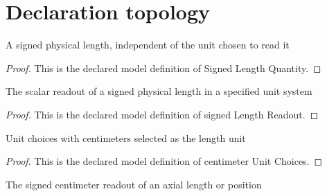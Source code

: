 \section{Declaration topology}
\begin{definition}
  \label{def:physics:phyx-mini-0076:phyxminiproblems-problemphyxmini0076-signedlengthquantity}
  A signed physical length, independent of the unit chosen to read it
\end{definition}
\begin{proof}
  This is the declared model definition of Signed Length Quantity.
\end{proof}
\begin{definition}
  \label{def:physics:phyx-mini-0076:phyxminiproblems-problemphyxmini0076-signedlengthreadout}
  The scalar readout of a signed physical length in a specified unit system
\end{definition}
\begin{proof}
  This is the declared model definition of signed Length Readout.
\end{proof}
\begin{definition}
  \label{def:physics:phyx-mini-0076:phyxminiproblems-problemphyxmini0076-centimeterunitchoices}
  Unit choices with centimeters selected as the length unit
\end{definition}
\begin{proof}
  This is the declared model definition of centimeter Unit Choices.
\end{proof}
\begin{definition}
  \label{def:physics:phyx-mini-0076:phyxminiproblems-problemphyxmini0076-signedlengthincentimeters}
  The signed centimeter readout of an axial length or position
\end{definition}
